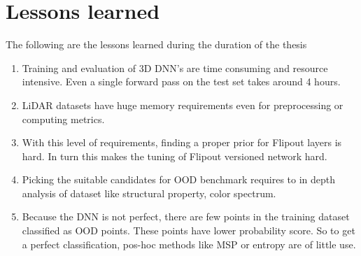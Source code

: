     
    \section{Lessons learned}
    The following are the lessons learned during the duration of the thesis
    \begin{enumerate}
        \item Training and evaluation of 3D DNN's are time consuming and resource intensive. Even a single forward pass on the test set takes around 4 hours.
        \item LiDAR datasets have huge memory requirements even for preprocessing or computing metrics.
        \item With this level of requirements, finding a proper prior for Flipout layers is hard. In turn this makes the tuning of Flipout versioned network hard.
        \item Picking the suitable candidates for OOD benchmark requires to in depth analysis of dataset like structural property, color spectrum.
        \item Because the DNN is not perfect, there are few points in the training dataset classified as OOD points. These points have lower probability score. So to get a perfect classification, pos-hoc methods like MSP or entropy are of little use.
    \end{enumerate}

